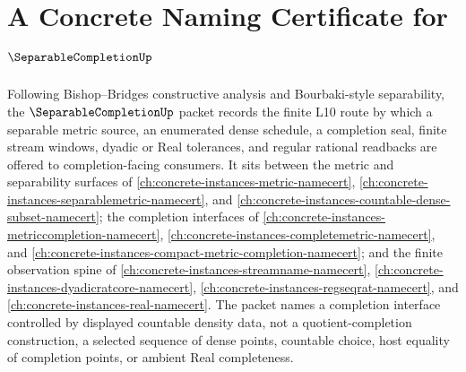 \chapter{A Concrete Naming Certificate for $\SeparableCompletionUp$}
\label{ch:concrete-instances-separable-completion-namecert}

Following Bishop--Bridges constructive analysis and Bourbaki-style separability, the $\SeparableCompletionUp$ packet records the finite L10 route by which a separable metric source, an enumerated dense schedule, a completion seal, finite stream windows, dyadic or Real tolerances, and regular rational readbacks are offered to completion-facing consumers. It sits between the metric and separability surfaces of \autoref{ch:concrete-instances-metric-namecert}, \autoref{ch:concrete-instances-separablemetric-namecert}, and \autoref{ch:concrete-instances-countable-dense-subset-namecert}; the completion interfaces of \autoref{ch:concrete-instances-metriccompletion-namecert}, \autoref{ch:concrete-instances-completemetric-namecert}, and \autoref{ch:concrete-instances-compact-metric-completion-namecert}; and the finite observation spine of \autoref{ch:concrete-instances-streamname-namecert}, \autoref{ch:concrete-instances-dyadicratcore-namecert}, \autoref{ch:concrete-instances-regseqrat-namecert}, and \autoref{ch:concrete-instances-real-namecert}. The packet names a completion interface controlled by displayed countable density data, not a quotient-completion construction, a selected sequence of dense points, countable choice, host equality of completion points, or ambient Real completeness.

